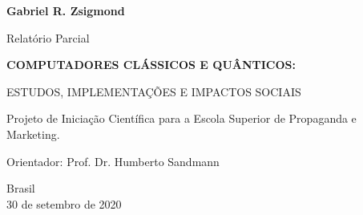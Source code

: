 \begin{titlepage}

    \begin{center}
        
        \textbf{Gabriel R. Zsigmond}
        
        \vspace{2cm}
        
        \Large
        Relatório Parcial
        \vspace{0.5cm}

        \LARGE
        \textbf{COMPUTADORES CLÁSSICOS E QUÂNTICOS:}
        
        \vspace{0.5cm}
        \large
        ESTUDOS, IMPLEMENTAÇÕES E IMPACTOS SOCIAIS
        
        
        \vspace{2cm}
        
        \large
        \begin{flushright}
            \begin{minipage}{10cm}
            Projeto de Iniciação Científica para a Escola Superior de Propaganda e Marketing.\linebreak[3]
            
            Orientador: Prof. Dr. Humberto Sandmann
            \end{minipage}
        \end{flushright}
        \vfill
        
        Brasil\\
        30 de setembro de 2020\\
        
    \end{center}

\end{titlepage}